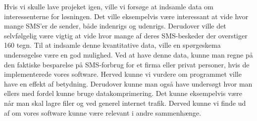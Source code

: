 Hvis vi skulle lave projeket igen, ville vi forsøge at indsamle data om interessenterne for løsningen. Det ville eksempelvis være interessant at vide hvor mange SMS'er de sender, både indenrigs og udenrigs. Derudover ville det selvfølgelig være vigtig at vide hvor mange af deres SMS-beskeder der overstiger 160 tegn. Til at indsamle denne kvantitative data, ville en spørgeskema undersøgelse være en god mulighed. Ved at have denne data, kunne man regne på den faktiske besparelse på SMS-forbrug for et firma eller privat personer, hvis de implementerede vores software. Herved kunne vi vurdere om programmet ville have en effekt af betydning. 
Derudover kunne man også have undersøgt hvor man ellers med fordel kunne bruge datakomprimering. Det kunne eksempelvis være når man skal lagre filer og ved generel internet trafik. Derved kunne vi finde ud af om vores software kunne være relevant i andre sammenhænge.
